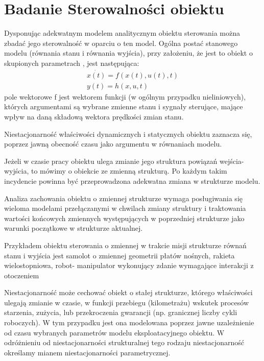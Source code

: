 \documentclass{article}
\begin{document}
	\maketitle
	\section{Badanie Sterowalności obiektu}
		Dysponując adekwatnym modelem analitycznym obiektu sterowania można zbadać jego
		sterowalność w oparciu o ten model. Ogólna postać stanowego modelu (równania stanu i
		równania wyjścia), przy założeniu, że jest to obiekt o skupionych parametrach , jest
		następująca:
		\begin{align*}
			\dot{x(t)} = f(x(t), u(t), t) \\
			y(t) = h(x,u,t)
		\end{align*}
		pole wektorowe f jest wektorem funkcji (w ogólnym przypadku nieliniowych), których
		argumentami są wybrane zmienne stanu i sygnały sterujące, mające wpływ na daną składową
		wektora prędkości zmian stanu.

		Niestacjonarność właściwości dynamicznych i statycznych obiektu zaznacza się, poprzez
		jawną obecność czasu jako argumentu w równaniach modelu.

		Jeżeli w czasie pracy obiektu ulega zmianie jego struktura powiązań wejścia-wyjścia, to
		mówimy o obiekcie ze zmienną strukturą. Po każdym takim incydencie powinna być
		przeprowadzona adekwatna zmiana w strukturze modelu.

		Analiza zachowania obiektu o zmiennej strukturze wymaga posługiwania się wieloma
		modelami przełączanymi w chwilach zmiany struktury i traktowania wartości końcowych
		zmiennych występujących w poprzedniej strukturze jako warunki początkowe w
		strukturze aktualnej.

		Przykładem obiektu sterowania o zmiennej w trakcie misji strukturze równań stanu i wyjścia
		jest samolot o zmiennej geometrii płatów nośnych, rakieta wielostopniowa, robot-
		manipulator wykonujący zdanie wymagające interakcji z otoczeniem 

		Niestacjonarność może cechować obiekt o stałej strukturze, którego właściwości ulegają
		zmianie w czasie, w funkcji przebiegu (kilometrażu) wskutek procesów starzenia, zużycia, lub
		przekroczenia gwarancji (np. granicznej liczby cykli roboczych). W tym przypadku jest ona
		modelowana poprzez jawne uzależnienie od czasu wybranych parametrów modelu
		eksploatacyjnego obiektu. W odróżnieniu od niestacjonarności strukturalnej tego rodzaju
		niestacjonarność określamy mianem niestacjonarności parametrycznej.
\end{document}

